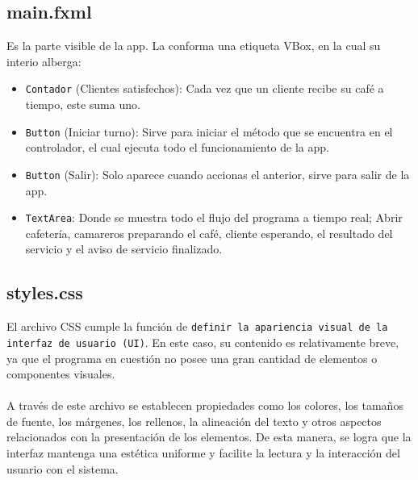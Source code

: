 \documentclass[14pt]{extarticle}
\begin{document}
    \newpage
    \subsection{main.fxml}
    Es la parte visible de la app. La conforma una etiqueta VBox, en la cual su interio alberga:
        \begin{itemize}
            \item \texttt{Contador} (Clientes satisfechos): Cada vez que un cliente recibe su café a tiempo, este suma uno.
            \item \texttt{Button} (Iniciar turno): Sirve para iniciar el método que se encuentra en el controlador, el cual ejecuta todo el funcionamiento de la app.
            \item \texttt{Button} (Salir): Solo aparece cuando accionas el anterior, sirve para salir de la app.
            \item \texttt{TextArea}: Donde se muestra todo el flujo del programa a tiempo real; Abrir cafetería, camareros preparando el café, cliente esperando, el resultado del servicio y el aviso de servicio finalizado.
        \end{itemize}

    \subsection{styles.css}
        El archivo CSS cumple la función de \texttt{definir la apariencia visual de la interfaz de usuario (UI)}. En este caso, su contenido es relativamente breve, ya que el programa en cuestión no posee una gran cantidad de elementos o componentes visuales.\\\\A través de este archivo se establecen propiedades como los colores, los tamaños de fuente, los márgenes, los rellenos, la alineación del texto y otros aspectos relacionados con la presentación de los elementos. De esta manera, se logra que la interfaz mantenga una estética uniforme y facilite la lectura y la interacción del usuario con el sistema.
\end{document}
